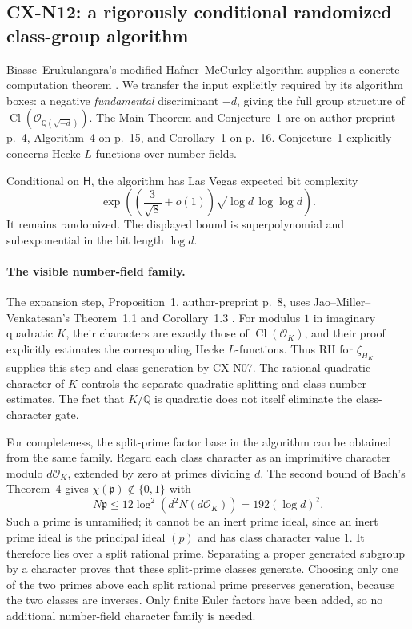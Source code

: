 \subsection{CX-N12: a rigorously conditional randomized class-group algorithm}
\label{cx-n12}

Biasse--Erukulangara's modified Hafner--McCurley algorithm supplies a
concrete computation theorem \cite{CXNBiasseErukulangara}. We transfer
the input explicitly required by its algorithm boxes: a negative
\emph{fundamental} discriminant \(-d\), giving the full group structure
of \(\operatorname{Cl}(\mathcal O_{\mathbb Q(\sqrt{-d})})\).
The Main Theorem and Conjecture~1 are on author-preprint p.~4,
Algorithm~4 on p.~15, and Corollary~1 on p.~16.
Conjecture~1 explicitly concerns Hecke \(L\)-functions over number fields.

Conditional on \(\mathsf H\), the algorithm has Las Vegas expected
bit complexity
\[
 \exp\!\left(\left(\frac3{\sqrt8}+o(1)\right)
                    \sqrt{\log d\,\log\log d}\right).           \tag{N12.1}
\]
It remains randomized. The displayed bound is superpolynomial and
subexponential in the bit length \(\log d\).

\paragraph{The visible number-field family.}
The expansion step, Proposition~1, author-preprint p.~8, uses
Jao--Miller--Venkatesan's Theorem~1.1 and Corollary~1.3
\cite[arXiv version, pp.~3--4; proof pp.~9--10]{CXNJMV09}.
For modulus \(1\) in imaginary quadratic \(K\), their characters are
exactly those of \(\operatorname{Cl}(\mathcal O_K)\), and their proof
explicitly estimates the corresponding Hecke \(L\)-functions.
Thus RH for \(\zeta_{H_K}\) supplies this step and class generation
by CX-N07. The rational quadratic character of \(K\) controls the
separate quadratic splitting and class-number estimates.
The fact that \(K/\mathbb Q\) is quadratic does not itself eliminate
the class-character gate.

For completeness, the split-prime factor base in the algorithm can be
obtained from the same family. Regard each class character as an
imprimitive character modulo \(d\mathcal O_K\), extended by zero at
primes dividing \(d\). The second bound of Bach's Theorem~4 gives
\(\chi(\mathfrak p)\notin\{0,1\}\) with
\[
 N\mathfrak p\leq12\log^2(d^2N(d\mathcal O_K))
              =192(\log d)^2.
\]
Such a prime is unramified; it cannot be an inert prime ideal, since
an inert prime ideal is the principal ideal \((p)\) and has class
character value \(1\). It therefore lies over a split rational prime.
Separating a proper generated subgroup by a character proves that
these split-prime classes generate. Choosing only one of the two
primes above each split rational prime preserves generation, because
the two classes are inverses. Only finite Euler factors have
been added, so no additional number-field character family is needed.

